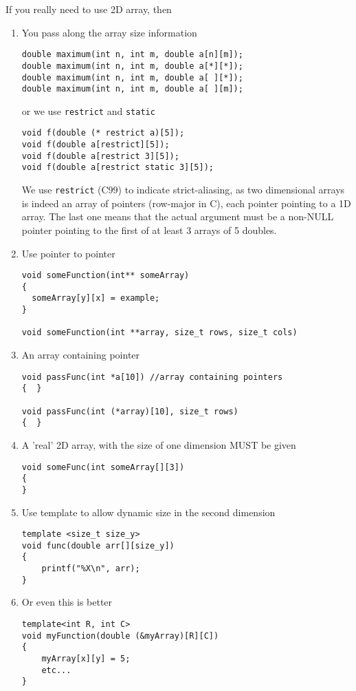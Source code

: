 If you really need to use 2D array, then
\begin{enumerate}
  \item You pass along the array size information
\begin{Verbatim}
double maximum(int n, int m, double a[n][m]);
double maximum(int n, int m, double a[*][*]);
double maximum(int n, int m, double a[ ][*]);
double maximum(int n, int m, double a[ ][m]);
\end{Verbatim}

or we use \verb!restrict! and \verb!static!
\begin{Verbatim}
void f(double (* restrict a)[5]);
void f(double a[restrict][5]);
void f(double a[restrict 3][5]);
void f(double a[restrict static 3][5]);
\end{Verbatim}
We use \verb!restrict! (C99) to indicate strict-aliasing, as two dimensional
arrays is indeed an array of pointers (row-major in C), each pointer pointing to
a 1D array. The last one means that the actual argument must be a non-NULL
pointer pointing to the first of at least 3 arrays of 5 doubles.

  \item Use pointer to pointer
\begin{verbatim}
void someFunction(int** someArray)
{
  someArray[y][x] = example;
}

void someFunction(int **array, size_t rows, size_t cols)
\end{verbatim}

   \item An array containing pointer
\begin{verbatim}
void passFunc(int *a[10]) //array containing pointers
{  }

void passFunc(int (*array)[10], size_t rows)
{  }
\end{verbatim}

  \item A 'real' 2D array, with the size of one dimension MUST be given
\begin{verbatim}
void someFunc(int someArray[][3])
{
}
\end{verbatim}
 
   \item Use template to allow dynamic size in the second dimension
\begin{verbatim}
template <size_t size_y>
void func(double arr[][size_y])
{
    printf("%X\n", arr);
}
\end{verbatim}
   \item Or even this is better
\begin{verbatim}
template<int R, int C>
void myFunction(double (&myArray)[R][C])
{
    myArray[x][y] = 5;
    etc...
}
\end{verbatim}

\end{enumerate}

